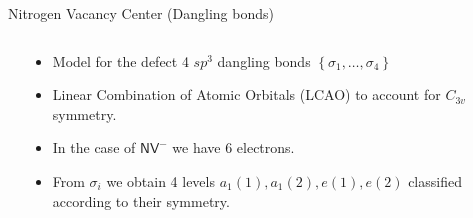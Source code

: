 \documentclass[notes=hide]{beamer}
\begin{document}
\begin{frame}{Nitrogen Vacancy Center (Dangling bonds)}
  \begin{columns}
    \begin{column}{0.5\textwidth}
    \end{column}
    \begin{column}{0.5\textwidth}
      \begin{itemize}
        \item Model for the defect 4 $ sp^{3} $ dangling bonds $ \left \{ \sigma _{1}, \ldots, \sigma _{4} \right \} $
        \item Linear Combination of Atomic Orbitals (LCAO) to
          account for $ C_{3v} $ symmetry.
        \item In the case of $ \mathsf{NV}^{-} $ we have
          6  electrons.
        \item From $ \sigma _{i} $ we obtain 4 levels $ a_1(1), a_1(2), e(1), e(2) $ classified according to their symmetry.

      \end{itemize}
    \end{column}
  \end{columns}
  
\end{frame}
\end{document}
